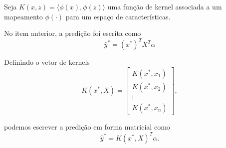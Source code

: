 

Seja $K(x,z) = \langle \phi(x), \phi(z) \rangle$ uma função de kernel associada a um mapeamento $\phi(\cdot)$ para um espaço de características.

No item anterior, a predição foi escrita como
$$ \hat{y}^* = (x^*)^T X^T \alpha $$


Definindo o vetor de kernels
\[
    K(x^*, X) =
    \begin{bmatrix}
        K(x^*, x_1) \\
        K(x^*, x_2) \\
        \vdots      \\
        K(x^*, x_n)
    \end{bmatrix},
\]

podemos escrever a predição em forma matricial como
\[
    \hat{y}^* = K(x^*, X)^T \alpha.
\]
